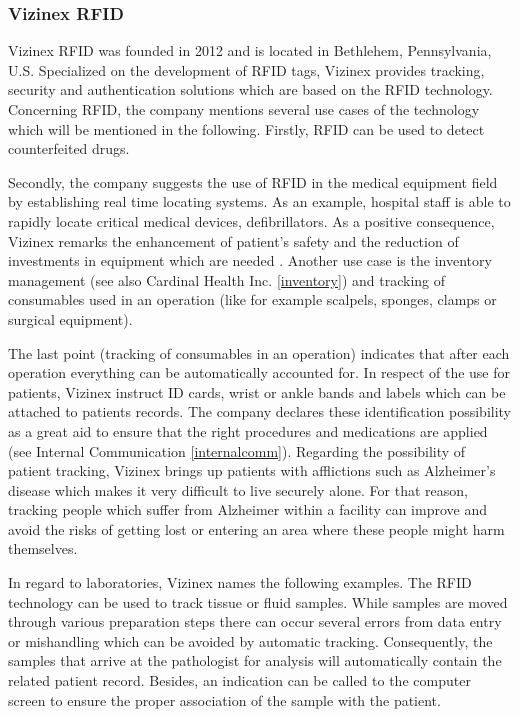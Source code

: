 \subsubsection{Vizinex RFID}

Vizinex RFID was founded in 2012 and is located in Bethlehem, Pennsylvania, U.S. Specialized on the development of RFID tags, Vizinex provides tracking, security and authentication solutions which are based on the RFID technology. Concerning RFID, the company mentions several use cases of the technology \cite{vizinex} which will be mentioned in the following. Firstly, RFID can be used to detect  counterfeited drugs. 

Secondly, the company suggests the use of RFID in the medical equipment field by establishing real time locating systems. As an example, hospital staff is able to rapidly locate critical medical devices, defibrillators. As a positive consequence, Vizinex remarks the enhancement of patient's safety and the reduction of investments in equipment which are needed \cite{vizinex}. Another use case is the inventory management (see also Cardinal Health Inc. \ref{inventory}) and tracking of consumables used in an operation (like for example scalpels, sponges, clamps or surgical equipment). 

The last point (tracking of consumables in an operation) indicates that after each operation everything can be automatically accounted for. In respect of the use for patients, Vizinex instruct ID cards, wrist or ankle bands and labels which can be attached to patients records. The company declares these identification possibility as a great aid to ensure that the right procedures and medications are applied (see Internal Communication \ref{internalcomm}). Regarding the possibility of patient tracking, Vizinex brings up patients with afflictions such as Alzheimer's disease which makes it very difficult to live securely alone. For that reason, tracking people which suffer from Alzheimer within a facility can improve and avoid the risks of getting lost or entering an area where these people might harm themselves.

In regard to laboratories, Vizinex names the following examples. The RFID technology can be used to track tissue or fluid samples. While samples are moved through various preparation steps there can occur several errors from data entry or mishandling which can be avoided by automatic tracking. Consequently, the samples that arrive at the pathologist for analysis will automatically contain the related patient record. Besides, an indication can be called to the computer screen to ensure the proper association of the sample with the patient. 

